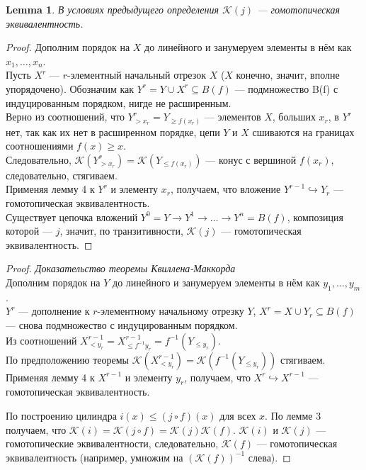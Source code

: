 \documentclass[a4paper, 12pt]{article}
\newtheorem{lemma}{Lemma}
\theoremstyle{definition}
\theoremstyle{remark}
\begin{document}
\begin{lemma}
  В условиях предыдущего определения $\mathcal{K}(j)$ --- гомотопическая эквивалентность.
\end{lemma}
\begin{proof}
  Дополним порядок на $X$ до линейного и занумеруем элементы в нём как $x_1,\ldots,x_n$.\\
  Пусть $X^r$ --- $r$-элементный начальный отрезок $X$ ($X$ конечно, значит, вполне упорядочено). Обозначим как $Y^r = Y \cup X^r \subseteq B(f)$ --- подмножество B(f) с индуцированным порядком, нигде не расширенным.\\
  Верно из соотношений, что $Y^r_{>x_r} = Y_{\geqslant f(x_r)}$ --- элементов $X$, больших $x_r$, в $Y^r$ нет, так как их нет в расширенном порядке, цепи $Y$ и $X$ сшиваются на границах соотношениями $f(x) \geqslant x$.\\
  Следовательно, $\mathcal{K}(Y^r_{>x_r}) = \mathcal{K}(Y_{\leqslant f(x_r)})$ --- конус с вершиной $f(x_r)$, следовательно, стягиваем.\\

  Применяя лемму 4 к $Y^r$ и элементу $x_r$, получаем, что вложение $Y^{r-1} \hookrightarrow Y_r$ --- гомотопическая эквивалентность.\\
  Существует цепочка вложений $Y^0 = Y \to Y^1 \to \ldots \to Y^n = B(f)$, композиция которой --- $j$, значит, по транзитивности, $\mathcal{K}(j)$ --- гомотопическая эквивалентность.
\end{proof}

\begin{proof}
  \textit{Доказательство теоремы Квиллена-Маккорда}\\
  Дополним порядок на $Y$ до линейного и занумеруем элементы в нём как $y_1,\ldots,y_m$.\\
  $Y^r$ --- дополнение к $r$-элементному начальному отрезку $Y$, $X^r = X \cup Y_r \subseteq B(f)$ --- снова подмножество с индуцированным порядком.\\
  Из соотношений $X^{r-1}_{<y_r} = X^{r-1}_{\leqslant f^{-1}{y_r}} = f^{-1}(Y_{\leqslant y_r})$.\\

  По предположению теоремы $\mathcal{K}(X^{r-1}_{<y_r}) = \mathcal{K}(f^{-1}(Y_{\leqslant y_r}))$ стягиваем.
  Применяя лемму 4 к $X^{r-1}$ и элементу $y_r$, получаем, что $X^r \hookrightarrow X^{r-1}$ --- гомотопическая эквивалентность.

  По построению цилиндра $i(x) \leqslant (j \circ f)(x)$ для всех $x$. По лемме 3 получаем, что $\mathcal{K}(i) = \mathcal{K}(j \circ f) = \mathcal{K}(j)\mathcal{K}(f)$. $\mathcal{K}(i)$ и $\mathcal{K}(j)$ --- гомотопические эквивалентности, следовательно, $\mathcal{K}(f)$ --- гомотопическая эквивалентность (например, умножим на $(\mathcal{K}(f))^{-1}$ слева).
\end{proof}
\end{document}
